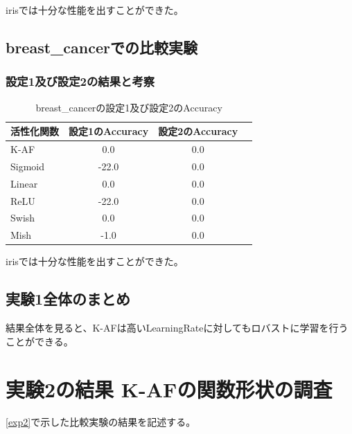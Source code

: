 irisでは十分な性能を出すことができた。



\subsection{breast\_cancerでの比較実験}
\label{ev:breastcancer}

\subsubsection{設定1及び設定2の結果と考察}


\begin{table}[htbp]
    \begin{center}
        \caption{breast\_cancerの設定1及び設定2のAccuracy}
        \vspace{2mm} 
        \begin{tabular}{l*{2}{c}r}
            活性化関数              & 設定1のAccuracy &  設定2のAccuracy \\
            \hline
            K-AF            & 0.0 & 0.0 \\
            Sigmoid            & -22.0 & 0.0\\
            Linear            & 0.0 & 0.0\\
            ReLU        & -22.0 & 0.0\\
            Swish           & 0.0 & 0.0 \\
            Mish           & -1.0 & 0.0\\
    
        \end{tabular}
    \end{center}
\end{table}



irisでは十分な性能を出すことができた。



\subsection{実験1全体のまとめ}
結果全体を見ると、K-AFは高いLearningRateに対してもロバストに学習を行うことができる。



\section{実験2の結果 K-AFの関数形状の調査}
\label{evo2}
\ref{exp2}で示した比較実験の結果を記述する。


